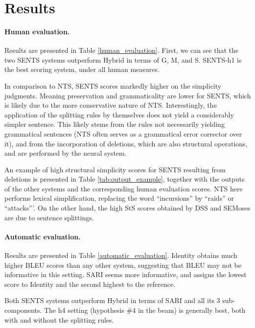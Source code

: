 \documentclass[11pt,a4paper]{article}
\begin{document}
\vspace{-1.6cm}
\section{Results} \label{sec:results}

\paragraph{Human evaluation.}
Results are presented in Table \ref{human_evaluation}. 
First, we can see that the two SENTS systems outperform {\sc Hybrid} in terms of G, 
M, and S. SENTS-h1 is the best scoring system, under all human measures.

In comparison to NTS, SENTS scores markedly higher on the simplicity judgments.
Meaning preservation and grammaticality are lower for SENTS, which is likely due to the more
conservative nature of NTS. Interestingly, the application of the splitting rules by themselves
does not yield a considerably simpler sentence. 
This likely stems from the rules not necessarily yielding grammatical sentences
(NTS often serves as a grammatical error corrector over it), and from the incorporation
of deletions, which are also structural operations, and are performed by the neural system.

An example of high structural simplicity scores for SENTS resulting from deletions is presented in Table \ref{tab:output_example}, together with the outputs of the other systems and the corresponding human evaluation scores.
NTS here performs  lexical simplification, replacing the word ``incursions'' by ``raids'' or ``attacks'''.
On the other hand, the high StS scores  obtained by DSS and SEMoses are due to sentence splittings.

\vspace{-0.2cm}
\paragraph{Automatic evaluation.}
Results are presented in Table \ref{automatic_evaluation}.
Identity obtains much higher BLEU scores than any other system, suggesting that BLEU may not be informative in this setting. 
SARI seems more informative, and assigns the lowest score to Identity and the second highest to the reference.

Both SENTS systems outperform {\sc Hybrid} in terms of SARI and all its 3 sub-components. 
The h4 setting (hypothesis \#4 in the beam) is generally best,
both with and without the splitting rules.
\end{document}
